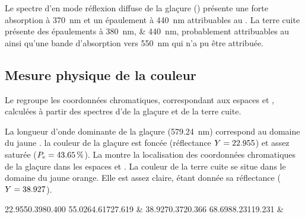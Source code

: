 Le spectre d'\AO en mode réflexion diffuse de la glaçure 
() présente une forte absorption à \SI{370}{\nm} 
et un épaulement à \SI{440}{\nm} attribuables au . La terre 
cuite présente des épaulements à \SIlist{380;440}{\nm}, probablement 
attribuables au  ainsi qu'une bande d'absorption vers 
\SI{550}{\nm} qui n'a pu être attribuée.

\subsection{Mesure physique de la couleur}
Le  regroupe les coordonnées chromatiques, 
correspondant aux espaces \Yxy et \Lab, calculées à partir des 
spectres d'\AO de la glaçure et de la terre cuite.

La longueur d'onde dominante de la glaçure (\SI{579.24}{\nm}) 
correspond au domaine du jaune \autocite{Kelly_1976}. la couleur 
de la glaçure est foncée (réflectance $Y=\num{22.955}$) et assez 
saturée ($P_\text{e}=\SI{43.65}{\percent}$). La  montre 
la localisation des coordonnées chromatiques de la glaçure dans les 
espaces \Yxy et \Lab. La couleur de la terre cuite se situe dans le 
domaine du jaune orange. Elle est assez claire, étant donnée sa 
réflectance ($Y=\num{38.927}$).

\begin{table}[hbt]
  \caption[\ -- Coordonnées chromatiques et longueur d'onde 
           dominante]
          {\legendeD.
           Coordonnées chromatiques dans les systèmes \Yxy et \Lab 
           et longueur d'onde dominante (illuminant D65, \ang{2},
           \SIrange{400}{700}{\nm}). (\up{\dag}\,\cite{Kelly_1976})}
  \label{saotab:6531}
  \begin{chrotab}
               {22.955}{0.398}{0.400}
               {55.026}{4.617}{27.619} &
    \tabularnewline
               {38.927}{0.372}{0.366}
               {68.698}{8.231}{19.231} &
               {\footnotemark{}}
    \tabularnewline
  \end{chrotab}
\end{table}

